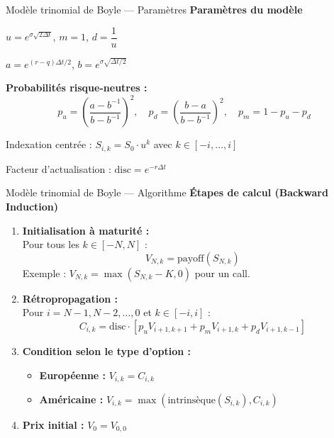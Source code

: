 \documentclass[aspectratio=169]{beamer}
\begin{document}
\begin{frame}{Modèle trinomial de Boyle — Paramètres}
  \small
  \textbf{Paramètres du modèle}
  \begin{formulabox}\scriptsize
    $u = e^{\sigma\sqrt{2\Delta t}}$, \quad $m = 1$, \quad $d = \dfrac{1}{u}$

    $a = e^{(r-q)\Delta t/2}$, \quad $b = e^{\sigma\sqrt{\Delta t/2}}$

    \vspace{1mm}
    \textbf{Probabilités risque-neutres :}
    \[
      p_u = \left(\dfrac{a - b^{-1}}{b - b^{-1}}\right)^2, \quad
      p_d = \left(\dfrac{b - a}{b - b^{-1}}\right)^2, \quad
      p_m = 1 - p_u - p_d
    \]
    
    \vspace{1mm}
    Indexation centrée : \quad
    $S_{i,k} = S_0 \cdot u^k$ \quad avec $k \in [-i, \ldots, i]$
    
    \vspace{1mm}
    Facteur d’actualisation : \quad $\text{disc} = e^{-r\Delta t}$
  \end{formulabox}
\end{frame}

\begin{frame}{Modèle trinomial de Boyle — Algorithme}
  \small
  \textbf{Étapes de calcul (Backward Induction)}
  \begin{enumerate}\scriptsize
    \item \textbf{Initialisation à maturité :}\\
    Pour tous les $k \in [-N, N]$ :
    \[
      V_{N,k} = \text{payoff}(S_{N,k})
    \]
    Exemple : $V_{N,k} = \max(S_{N,k} - K, 0)$ pour un call.
    
    \vspace{2mm}
    \item \textbf{Rétropropagation :}\\
    Pour $i = N-1, N-2, \ldots, 0$ et $k \in [-i, i]$ :
    \[
      C_{i,k} = \text{disc} \cdot [p_u V_{i+1,k+1} + p_m V_{i+1,k} + p_d V_{i+1,k-1}]
    \]
    
    \vspace{2mm}
    \item \textbf{Condition selon le type d’option :}
    \begin{itemize}
      \item \textbf{Européenne :} $V_{i,k} = C_{i,k}$
      \item \textbf{Américaine :} $V_{i,k} = \max(\text{intrinsèque}(S_{i,k}), C_{i,k})$
    \end{itemize}
    
    \vspace{2mm}
    \item \textbf{Prix initial :} $V_0 = V_{0,0}$
  \end{enumerate}
\end{frame}
\end{document}
